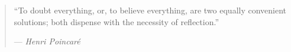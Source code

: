 %
\cleardoublepage
\thispagestyle{empty}

\begin{quote}
\noindent``To doubt everything, or, to believe everything, are two equally convenient solutions; both dispense with the necessity of reflection.''
	
--- \emph{Henri Poincaré}
\end{quote}

\clearemptydoublepage